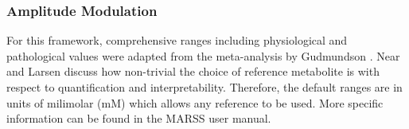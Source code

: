\subsubsection{Amplitude Modulation}
For this framework, comprehensive ranges including physiological and pathological values were adapted from the meta-analysis by Gudmundson \etal\cite{Gudmundson2023}. Near\cite{Near2021} and Larsen\cite{Larsen2021} discuss how non-trivial the choice of reference metabolite is with respect to quantification and interpretability. Therefore, the default ranges are in units of milimolar (mM) which allows any reference to be used. More specific information can be found in the MARSS user manual.
 
